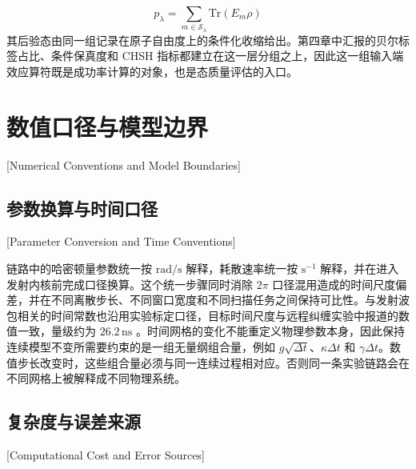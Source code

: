 \begin{equation}
p_\lambda=\sum_{m\in\mathcal{S}_\lambda}\mathrm{Tr}(E_m\rho)
\label{eq:bell-label-weight}
\end{equation}
其后验态由同一组记录在原子自由度上的条件化收缩给出。第四章中汇报的贝尔标签占比、条件保真度和 CHSH 指标都建立在这一层分组之上，因此这一组输入端效应算符既是成功率计算的对象，也是态质量评估的入口。

\section{数值口径与模型边界}[Numerical Conventions and Model Boundaries]

\subsection{参数换算与时间口径}[Parameter Conversion and Time Conventions]

链路中的哈密顿量参数统一按 $\mathrm{rad/s}$ 解释，耗散速率统一按 $\mathrm{s^{-1}}$ 解释，并在进入发射内核前完成口径换算。这个统一步骤同时消除 $2\pi$ 口径混用造成的时间尺度偏差，并在不同离散步长、不同窗口宽度和不同扫描任务之间保持可比性。与发射波包相关的时间常数也沿用实验标定口径，目标时间尺度与远程纠缠实验中报道的数值一致，量级约为 $26.2\,\mathrm{ns}$ \cite{vanleent2022entangling}。时间网格的变化不能重定义物理参数本身，因此保持连续模型不变所需要约束的是一组无量纲组合量，例如 $g\sqrt{\Delta t}$、$\kappa\Delta t$ 和 $\gamma\Delta t$。数值步长改变时，这些组合量必须与同一连续过程相对应。否则同一条实验链路会在不同网格上被解释成不同物理系统。

\subsection{复杂度与误差来源}[Computational Cost and Error Sources]

